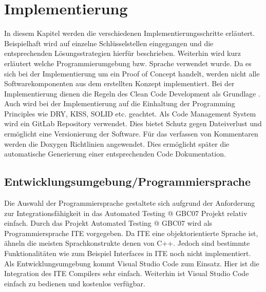 \onehalfspacing
\section{Implementierung}
In diesem Kapitel werden die verschiedenen Implementierungsschritte erläutert. Beispielhaft wird auf einzelne Schlüsselstellen eingegangen und die entsprechenden Lösungsstrategien hierfür beschrieben. Weiterhin wird kurz  erläutert welche Programmierumgebung bzw. Sprache verwendet wurde. Da es sich bei der Implementierung um ein Proof of Concept handelt, werden nicht alle Softwarekomponenten aus dem erstellten Konzept implementiert. Bei der Implementierung dienen die Regeln des Clean Code Development als Grundlage \cite{CleanCodeDevelopment.2015}. Auch wird bei der Implementierung auf die Einhaltung der Programming Principles wie DRY, KISS, SOLID etc. geachtet. Als Code Management System wird ein GitLab Repository verwendet. Dies bietet Schutz gegen Dateiverlust und ermöglicht eine Versionierung der Software. Für das verfassen von Kommentaren werden die Doxygen Richtlinien angewendet. Dies ermöglicht später die automatische Generierung einer entsprechenden Code Dokumentation.
	\subsection{Entwicklungsumgebung/Programmiersprache}
	Die Auswahl der Programmiersprache gestaltete sich aufgrund der Anforderung zur Integrationsfähigkeit in das Automated Testing @ GBC07  Projekt relativ einfach. Durch das Projekt Automated Testing @ GBC07  wird als Programmiersprache ITE vorgegeben. Da ITE eine objektorientierte Sprache ist, ähneln die meisten Sprachkonstrukte denen von C++. Jedoch sind bestimmte Funktionalitäten wie zum Beispiel Interfaces in ITE noch nicht implementiert. Als Entwicklungsumgebung kommt Visual Studio Code zum Einsatz. Hier ist die Integration des ITE Compilers sehr einfach. Weiterhin ist Visual Studio Code einfach zu bedienen und kostenlos verfügbar. 
	\newpage
